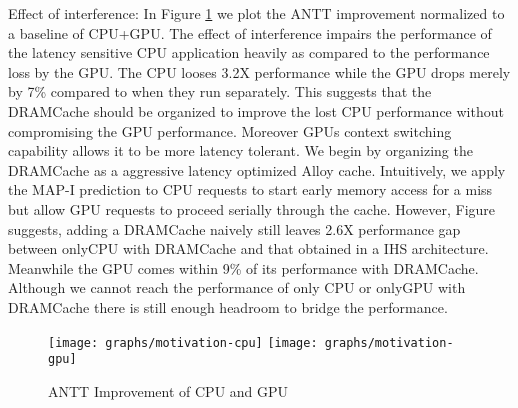 \par Effect of interference: In Figure \ref{fig:motivation} we plot the ANTT improvement normalized to a baseline of CPU+GPU. The effect of interference impairs the performance of the latency sensitive CPU application heavily as compared to the performance loss by the GPU. The CPU looses 3.2X performance while the GPU drops merely by 7\% compared to when they run separately. This suggests that the DRAMCache should be organized to improve the lost CPU performance without compromising the GPU performance. Moreover GPUs context switching capability allows it to be more latency tolerant. We begin by organizing the DRAMCache as a aggressive latency optimized  Alloy cache. Intuitively, we apply the MAP-I prediction to CPU requests to start early memory access for a miss but allow GPU requests to proceed serially through the cache. However, Figure  suggests, adding a DRAMCache naively still leaves 2.6X performance gap between onlyCPU with DRAMCache and that obtained in a IHS architecture. Meanwhile the GPU comes within 9\% of its performance with DRAMCache. Although we cannot reach the performance of only CPU or onlyGPU with DRAMCache there is still enough headroom to bridge the performance.

\begin{figure}[htbp]
   \texttt{[image: graphs/motivation-cpu]}
   \texttt{[image: graphs/motivation-gpu]}
   \caption{ANTT Improvement of CPU and GPU}
   \label{fig:motivation}
\end{figure}
